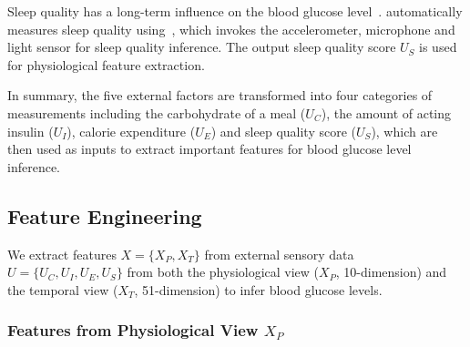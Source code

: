 Sleep quality has a long-term influence on the blood glucose level~\cite{bib:DRCP15:Iwasaki}.
\sysname automatically measures sleep quality using~\cite{bib:UbiComp14:Gu}, which invokes the accelerometer, microphone and light sensor for sleep quality inference.
The output sleep quality score $U_S$ is used for physiological feature extraction.

In summary, the five external factors are transformed into four categories of measurements including the carbohydrate of a meal ($U_C$), the amount of acting insulin ($U_I$), calorie expenditure ($U_E$) and sleep quality score ($U_S$), which are then used as inputs to extract important features for blood glucose level inference.

\subsection{Feature Engineering}
\label{subsec:features}
We extract features $X=\{X_P, X_T\}$ from external sensory data $U=\{U_C, U_I, U_E, U_S\}$ from both the physiological view ($X_P$, 10-dimension) and the temporal view ($X_T$, 51-dimension) to infer blood glucose levels.

\subsubsection{Features from Physiological View $X_P$}
\label{subsubsec:physiological}


